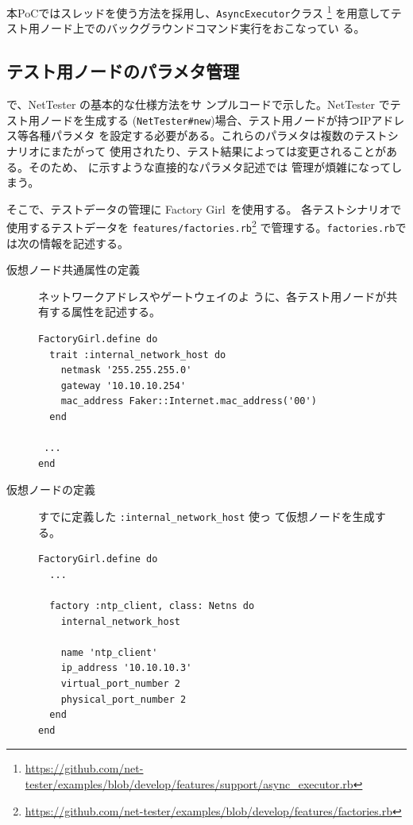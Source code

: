 本PoCではスレッドを使う方法を採用し、\verb|AsyncExecutor|クラス
\footnote{\url{https://github.com/net-tester/examples/blob/develop/features/support/async_executor.rb}}
を用意してテスト用ノード上でのバックグラウンドコマンド実行をおこなってい
る。

  \subsection{テスト用ノードのパラメタ管理}
  \label{sec:test-parameter-management}

で、NetTester の基本的な仕様方法をサ
ンプルコードで示した。NetTester でテスト用ノードを生成する
(\verb|NetTester#new|)場合、テスト用ノードが持つIPアドレス等各種パラメタ
を設定する必要がある。これらのパラメタは複数のテストシナリオにまたがって
使用されたり、テスト結果によっては変更されることがある。そのため、
に示すような直接的なパラメタ記述では
管理が煩雑になってしまう。

そこで、テストデータの管理に Factory Girl~\cite{factory-girl}を使用する。
各テストシナリオで使用するテストデータを
\verb|features/factories.rb|\footnote{\url{https://github.com/net-tester/examples/blob/develop/features/factories.rb}}
で管理する。\verb|factories.rb|では次の情報を記述する。
\begin{description}
 \item[仮想ノード共通属性の定義] ネットワークアドレスやゲートウェイのよ
            うに、各テスト用ノードが共有する属性を記述する。
\begin{lstlisting}
FactoryGirl.define do
  trait :internal_network_host do
    netmask '255.255.255.0'
    gateway '10.10.10.254'
    mac_address Faker::Internet.mac_address('00')
  end

 ...
end
\end{lstlisting}
 \item[仮想ノードの定義] すでに定義した \verb|:internal_network_host| 使っ
            て仮想ノードを生成する。
\begin{lstlisting}
FactoryGirl.define do
  ...

  factory :ntp_client, class: Netns do
    internal_network_host

    name 'ntp_client'
    ip_address '10.10.10.3'
    virtual_port_number 2
    physical_port_number 2
  end
end
\end{lstlisting}
\end{description}


